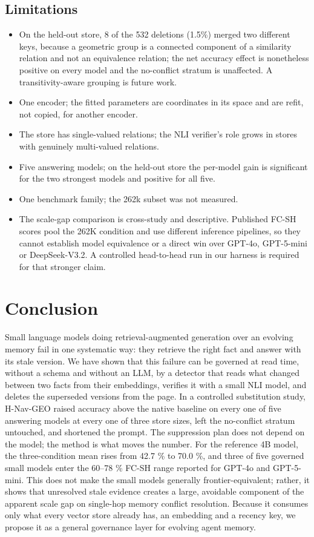 \documentclass[journal=jcisd8,manuscript=article]{achemso}
\begin{document}
\subsection{Limitations}

\begin{itemize}
\item On the held-out store, 8 of the 532 deletions (1.5\%) merged two different keys, because a geometric group is a connected component of a similarity relation and not an equivalence relation; the net accuracy effect is nonetheless positive on every model and the no-conflict stratum is unaffected. A transitivity-aware grouping is future work.
\item One encoder; the fitted parameters are coordinates in its space and are refit, not copied, for another encoder.
\item The store has single-valued relations; the NLI verifier's role grows in stores with genuinely multi-valued relations.
\item Five answering models; on the held-out store the per-model gain is significant for the two strongest models and positive for all five.
\item One benchmark family; the 262k subset was not measured.
\item The scale-gap comparison is cross-study and descriptive. Published FC-SH scores pool   the 262K condition and use different inference pipelines, so they cannot establish   model equivalence or a direct win over GPT-4o, GPT-5-mini or DeepSeek-V3.2. A   controlled head-to-head run in our harness is required for that stronger claim.
\end{itemize}

\section{Conclusion}

Small language models doing retrieval-augmented generation over an evolving memory fail in one systematic way: they retrieve the right fact and answer with its stale version. We have shown that this failure can be governed at read time, without a schema and without an LLM, by a detector that reads what changed between two facts from their embeddings, verifies it with a small NLI model, and deletes the superseded versions from the page. In a controlled substitution study, H-Nav-GEO raised accuracy above the native baseline on every one of five answering models at every one of three store sizes, left the no-conflict stratum untouched, and shortened the prompt. The suppression plan does not depend on the model; the method is what moves the number. For the reference 4B model, the three-condition mean rises from 42.7 \% to 70.0 \%, and three of five governed small models enter the 60--78 \% FC-SH range reported for GPT-4o and GPT-5-mini. This does not make the small models generally frontier-equivalent; rather, it shows that unresolved stale evidence creates a large, avoidable component of the apparent scale gap on single-hop memory conflict resolution. Because it consumes only what every vector store already has, an embedding and a recency key, we propose it as a general governance layer for evolving agent memory.
\end{document}
